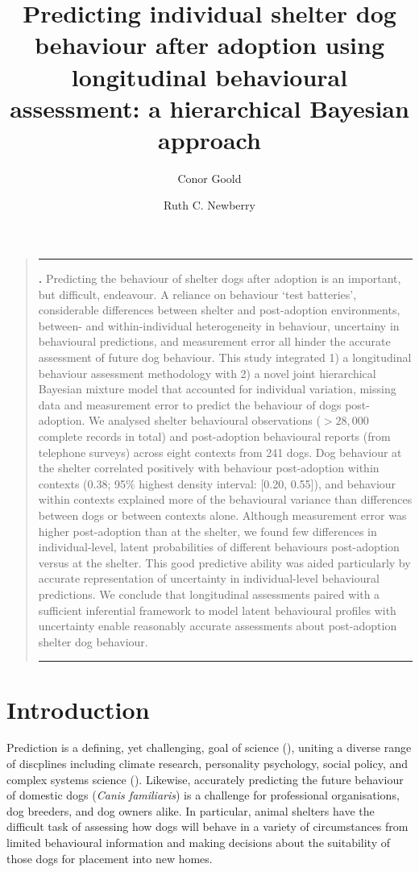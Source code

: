 \documentclass[12pt]{article}
\title{Predicting individual shelter dog behaviour after adoption using longitudinal behavioural assessment: a hierarchical Bayesian approach}
\author[1,2]{Conor Goold}
\author[2]{Ruth C. Newberry}
\affil[1]{\small{School of Biology, Faculty of Biological Sciences, University of Leeds, UK, LS2 9JT}}
\affil[2]{\small{Department of Animal and Aquacultural Sciences, Faculty of Biosciences, Norwegian University of Life Sciences, \r{A}s, Norway}}
\date{}
\renewenvironment{abstract}
{\begin{quote}
\small
\noindent \rule{\linewidth}{.5pt}\par{\bfseries \abstractname.}}
{\medskip\noindent \rule{\linewidth}{.5pt}
\end{quote}
}
\begin{document}
\linenumbers
\modulolinenumbers[5]

\maketitle

\begin{abstract}
  \small
  Predicting the behaviour of shelter dogs after adoption is an important, but difficult, endeavour. A reliance on behaviour `test batteries', considerable differences between shelter and post-adoption environments, between- and within-individual heterogeneity in behaviour, uncertainy in behavioural predictions, and measurement error all hinder the accurate assessment of future dog behaviour. This study integrated 1) a longitudinal behaviour assessment methodology with 2) a novel joint hierarchical Bayesian mixture model that accounted for individual variation, missing data and measurement error to predict the behaviour of dogs post-adoption. We analysed shelter behavioural observations ($> 28,000$ complete records in total) and post-adoption behavioural reports (from telephone surveys) across eight contexts from 241 dogs. Dog behaviour at the shelter correlated positively with behaviour post-adoption within contexts (0.38; 95\% highest density interval: [0.20, 0.55]), and behaviour within contexts explained more of the behavioural variance than differences between dogs or between contexts alone. Although measurement error was higher post-adoption than at the shelter, we found few differences in individual-level, latent probabilities of different behaviours post-adoption versus at the shelter. This good predictive ability was aided particularly by accurate representation of uncertainty in individual-level behavioural predictions. We conclude that longitudinal assessments paired with a sufficient inferential framework to model latent behavioural profiles with uncertainty enable reasonably accurate assessments about post-adoption shelter dog behaviour.\\
\end{abstract}
\newpage

\section{Introduction}
Prediction is a defining, yet challenging, goal of science (\cite{hofstadter1951}), uniting a diverse range of discplines including climate research, personality psychology, social policy, and complex systems science (\cite{sarewitz1999}). Likewise, accurately predicting the future behaviour of domestic dogs (\textit{Canis familiaris}) is a challenge for professional organisations, dog breeders, and dog owners alike. In particular, animal shelters have the difficult task of assessing how dogs will behave in a variety of circumstances from limited behavioural information and making decisions about the suitability of those dogs for placement into new homes.
\end{document}
